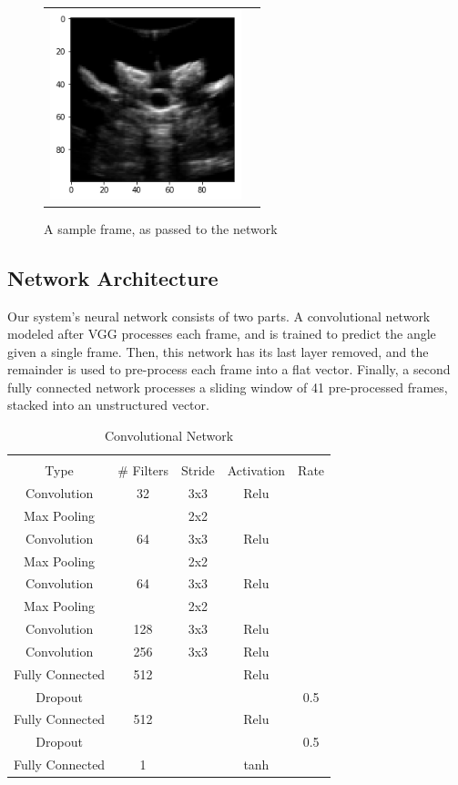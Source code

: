 \documentclass{article}
\begin{document}
\begin{figure}
\centering
\begin{tabular}{cc}
\centering
\includegraphics[height=5.5cm,keepaspectratio]{SampleInput}
\end{tabular}
\caption{A sample frame, as passed to the network
}
\end{figure}

\subsection{Network Architecture}
\label{ssec:Network Architecture}
Our system's neural network consists of two parts. A convolutional network modeled after VGG processes each frame, and is trained to predict the angle given a single frame. Then, this network has its last layer removed, and the remainder is used to pre-process each frame into a flat vector. Finally, a second fully connected network processes a sliding window of 41 pre-processed frames, stacked into an unstructured vector.

\begin{table}[ht]
\caption{Convolutional Network}
\begin{tabular}{c c c c c}
\hline \\
Type & \# Filters & Stride & Activation & Rate \\
\hline
Convolution & 32 & 3x3 & Relu \\
Max Pooling &    & 2x2 &      \\
Convolution & 64 & 3x3 & Relu \\
Max Pooling &    & 2x2 &      \\
Convolution & 64 & 3x3 & Relu \\
Max Pooling &    & 2x2 &      \\
Convolution &128 & 3x3 & Relu \\
Convolution &256 & 3x3 & Relu \\
Fully Connected & 512 & & Relu \\
Dropout & & & & 0.5 \\
Fully Connected & 512 & & Relu \\
Dropout & & & & 0.5 \\
Fully Connected & 1 & & tanh \\
\end{tabular}
\end{table}
\end{document}
